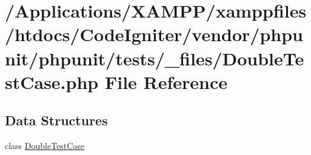 \hypertarget{_double_test_case_8php}{}\section{/\+Applications/\+X\+A\+M\+P\+P/xamppfiles/htdocs/\+Code\+Igniter/vendor/phpunit/phpunit/tests/\+\_\+files/\+Double\+Test\+Case.php File Reference}
\label{_double_test_case_8php}
\subsection*{Data Structures}
\begin{DoxyCompactItemize}
\item 
class \mbox{\hyperlink{class_double_test_case}{Double\+Test\+Case}}
\end{DoxyCompactItemize}
